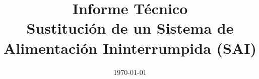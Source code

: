 \title{Informe Técnico\\ \textbf{Sustitución de un Sistema de Alimentación
Ininterrumpida (SAI) }}

\newcommand{\resumen}{   
}

\documentclass[conference,12pt]{IEEEtran}
\usepackage[pdftex,pdfencoding=auto]{hyperref}
\usepackage[utf8]{inputenc} %
\usepackage{amsmath} %
\usepackage{lipsum} %
\usepackage{tikz} %
\usepackage{float}
\usepackage{ragged2e} %
\usepackage[T1]{fontenc}    %
\usepackage{colortbl} %
\usepackage{pgfplots}
\usepackage[spanish]{babel} %
\usepackage{caption}
\usepackage{pgffor}  %
\usepackage{fancyhdr} %
\usepackage{circuitikz}

\setlength{\spaceskip}{4.8pt}
\renewcommand{\thesection}{\arabic{section}} %
\renewcommand{\thesubsection}{\thesection.\arabic{subsection}} %
\renewcommand{\thesubsubsection}{\thesubsection.\arabic{subsubsection}} %
\let\OldTextField\TextField
\renewcommand{\TextField}[2][]{%
  \raisebox{-0.3ex}{\OldTextField[height=.85em,  bordercolor={1 1 1}, backgroundcolor={1 1 1},#1]{#2}}%
}
\renewcommand{\baselinestretch}{1.5}  %
\renewcommand{\rmdefault}{phv}  %
\fontsize{12}{15}\selectfont  %
\onecolumn
\pagestyle{fancy}
\fancyhf{} %
\fancyfoot[C]{\thepage} %
\renewcommand{\headrulewidth}{0pt} %
\renewcommand{\footrulewidth}{0pt} %
\author{\TextField[name=Proyecto,width=16cm]{}}
\date{\today}

